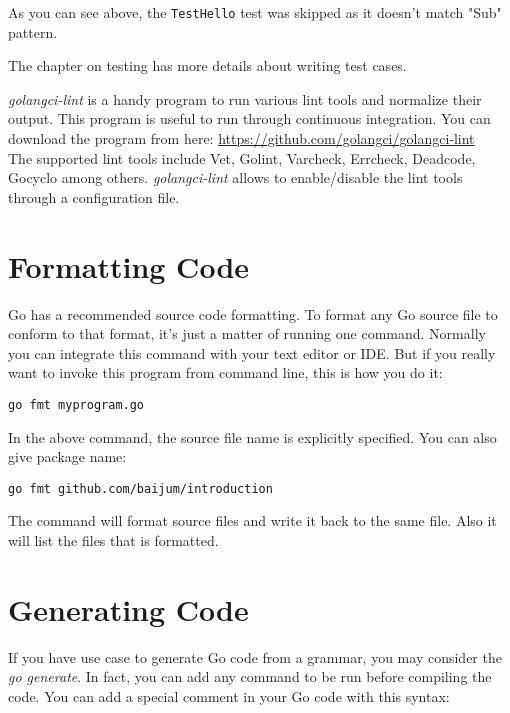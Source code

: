 As you can see above, the \texttt{TestHello} test was skipped as it
doesn't match "Sub" pattern.

The chapter on testing has more details about writing test cases.

\textit{golangci-lint} is a handy program to run various lint tools and
normalize their output. This program is useful to run through continuous
integration. You can download the program from here:
\url{https://github.com/golangci/golangci-lint}\\

The supported lint tools include Vet, Golint, Varcheck, Errcheck, Deadcode,
Gocyclo among others. \textit{golangci-lint} allows to enable/disable the lint
tools through a configuration file.

\section{Formatting Code}

Go has a recommended source code formatting.  To
format any Go source file to conform to that format, it's just a
matter of running one command.  Normally you can integrate this
command with your text editor or IDE.  But if you really want to
invoke this program from command line, this is how you do it:

\begin{lstlisting}[numbers=none]
go fmt myprogram.go
\end{lstlisting}

In the above command, the source file name is explicitly specified.
You can also give package name:

\begin{lstlisting}[numbers=none]
go fmt github.com/baijum/introduction
\end{lstlisting}

The command will format source files and write it back to the same
file. Also it will list the files that is formatted.

\section{Generating Code}

If you have use case to generate Go code from a grammar, you may consider
the \textit{go generate}. In fact, you can add any command to be run before
compiling the code. You can add a special comment in your Go code with this
syntax:

